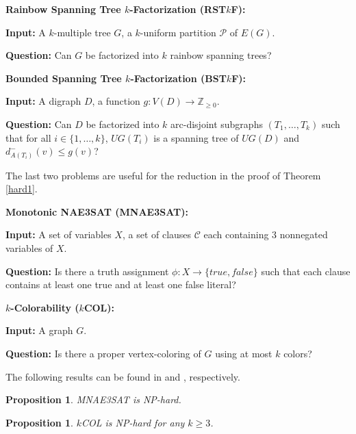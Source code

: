 \documentclass{article}
\newtheorem{Proposition}[Statement]{Proposition}
\begin{document}
\medskip

\noindent \textbf{Rainbow Spanning Tree $k$-Factorization (RST$k$F):}
\smallskip

\noindent\textbf{Input:} A $k$-multiple tree $G$, a $k$-uniform partition $\mathcal{P}$ of $E(G)$.
\smallskip

\noindent\textbf{Question:} Can $G$ be factorized into $k$ rainbow spanning trees?
\medskip

\medskip

\noindent \textbf{Bounded Spanning Tree $k$-Factorization (BST$k$F):}
\smallskip

\noindent\textbf{Input:} A digraph $D$, a function $g:V(D) \rightarrow \mathbb{Z}_{\geq 0}$.
\smallskip

\noindent\textbf{Question:} Can $D$ be factorized into $k$ arc-disjoint subgraphs $(T_1,\ldots,T_k)$ such that for all $i \in \{1,\ldots,k\}$, $UG(T_i)$ is a spanning tree of $UG(D)$ and $d^-_{A(T_i)}(v)\leq g(v)$?
\medskip



The last two problems are useful for the reduction in the proof of Theorem \ref{hard1}.
\medskip

\noindent \textbf{Monotonic NAE3SAT (MNAE3SAT):}
\smallskip

\noindent\textbf{Input:} A set of variables $X$, a set of clauses $\mathcal{C}$ each containing 3 nonnegated variables of $X$.
\smallskip

\noindent\textbf{Question:} Is there a truth assignment $\phi:X \rightarrow \{true,false\}$ such that each clause contains at least one true and at least one false literal?
\bigskip

\noindent \textbf{$k$-Colorability ($k$COL):}
\smallskip

\noindent\textbf{Input:} A graph $G$.
\smallskip

\noindent\textbf{Question:} Is there a proper vertex-coloring of $G$ using at most $k$ colors?
\medskip

The following results can be found in \cite{schaefer} and \cite{gj}, respectively.

\begin{Proposition}\label{sathard}
MNAE3SAT is NP-hard.
\end{Proposition}

\begin{Proposition}\label{colhard}
$k$COL is NP-hard for any $k \geq 3$.
\end{Proposition}
\end{document}
